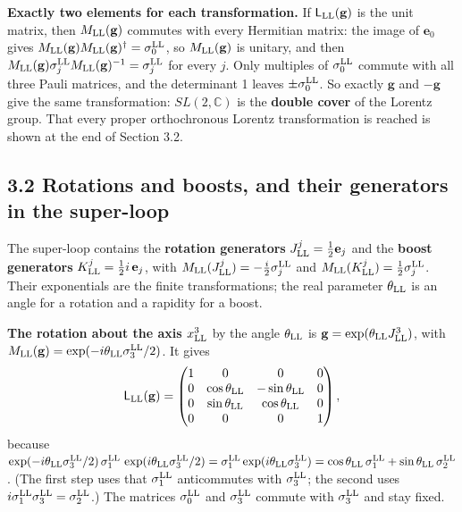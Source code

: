 \documentclass[
  10pt,
]{article}
\begin{document}
\textbf{Exactly two elements for each transformation.} If
\(\mathsf L_{\rm LL}(\mathbf g)\) is the unit matrix, then
\(M_{\rm LL}(\mathbf g)\) commutes with every Hermitian matrix: the
image of \(\mathbf e_0\) gives
\(M_{\rm LL}(\mathbf g)M_{\rm LL}(\mathbf g)^\dagger=\sigma^{\rm LL}_0\),
so \(M_{\rm LL}(\mathbf g)\) is unitary, and then
\(M_{\rm LL}(\mathbf g)\sigma^{\rm LL}_jM_{\rm LL}(\mathbf g)^{-1}=\sigma^{\rm LL}_j\)
for every \(j\). Only multiples of \(\sigma^{\rm LL}_0\) commute with
all three Pauli matrices, and the determinant 1 leaves
\(\pm\sigma^{\rm LL}_0\). So exactly \(\mathbf g\) and \(-\mathbf g\)
give the same transformation: \(SL(2,\mathbb C)\) is the \textbf{double
cover} of the Lorentz group. That every proper orthochronous Lorentz
transformation is reached is shown at the end of Section 3.2.

\hypertarget{rotations-and-boosts-and-their-generators-in-the-super-loop}{%
\subsection{3.2 Rotations and boosts, and their generators in the
super-loop}\label{rotations-and-boosts-and-their-generators-in-the-super-loop}}

The super-loop contains the \textbf{rotation generators}
\(J^j_{\rm LL}=\tfrac12\mathbf e_j\) and the \textbf{boost generators}
\(K^j_{\rm LL}=\tfrac12i\,\mathbf e_j\), with
\(M_{\rm LL}(J^j_{\rm LL})=-\tfrac i2\sigma^{\rm LL}_j\) and
\(M_{\rm LL}(K^j_{\rm LL})=\tfrac12\sigma^{\rm LL}_j\). Their
exponentials are the finite transformations; the real parameter
\(\theta_{\rm LL}\) is an angle for a rotation and a rapidity for a
boost.

\textbf{The rotation about the axis \(x^3_{\rm LL}\)} by the angle
\(\theta_{\rm LL}\) is \(\mathbf g=\exp(\theta_{\rm LL}J^3_{\rm LL})\),
with
\(M_{\rm LL}(\mathbf g)=\exp(-i\theta_{\rm LL}\sigma^{\rm LL}_3/2)\). It
gives
\[\mathsf L_{\rm LL}(\mathbf g)=\begin{pmatrix}1&0&0&0\\0&\cos\theta_{\rm LL}&-\sin\theta_{\rm LL}&0\\0&\sin\theta_{\rm LL}&\cos\theta_{\rm LL}&0\\0&0&0&1\end{pmatrix},\]
because
\(\exp(-i\theta_{\rm LL}\sigma^{\rm LL}_3/2)\,\sigma^{\rm LL}_1\,\exp(i\theta_{\rm LL}\sigma^{\rm LL}_3/2)=\sigma^{\rm LL}_1\exp(i\theta_{\rm LL}\sigma^{\rm LL}_3)=\cos\theta_{\rm LL}\,\sigma^{\rm LL}_1+\sin\theta_{\rm LL}\,\sigma^{\rm LL}_2\).
(The first step uses that \(\sigma^{\rm LL}_1\) anticommutes with
\(\sigma^{\rm LL}_3\); the second uses
\(i\sigma^{\rm LL}_1\sigma^{\rm LL}_3=\sigma^{\rm LL}_2\).) The matrices
\(\sigma^{\rm LL}_0\) and \(\sigma^{\rm LL}_3\) commute with
\(\sigma^{\rm LL}_3\) and stay fixed.
\end{document}
